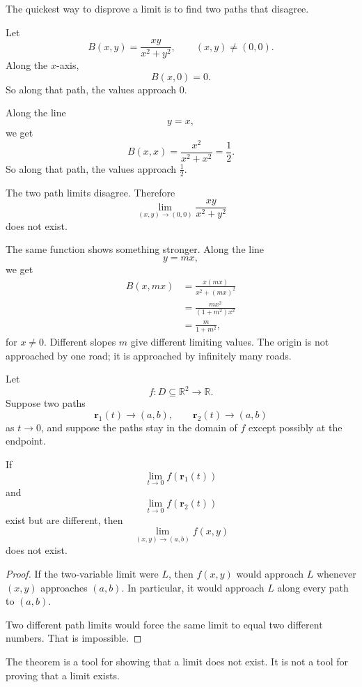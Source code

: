 The quickest way to disprove a limit is to find two paths that disagree.

\begin{example}
Let
\[
    B(x,y)=\frac{xy}{x^2+y^2},
    \qquad (x,y)\ne(0,0).
\]
Along the \(x\)-axis,
\[
    B(x,0)=0.
\]
So along that path, the values approach \(0\).

Along the line
\[
    y=x,
\]
we get
\[
    B(x,x)=\frac{x^2}{x^2+x^2}=\frac12.
\]
So along that path, the values approach \(\frac12\).

The two path limits disagree.  Therefore
\[
    \lim_{(x,y)\to(0,0)}\frac{xy}{x^2+y^2}
\]
does not exist.
\end{example}

The same function shows something stronger.  Along the line
\[
    y=mx,
\]
we get
\[
\begin{aligned}
    B(x,mx)
    &=
    \frac{x(mx)}{x^2+(mx)^2}  \\
    &=
    \frac{mx^2}{(1+m^2)x^2} \\
    &=
    \frac{m}{1+m^2},
\end{aligned}
\]
for \(x\ne0\).  Different slopes \(m\) give different limiting values.  The origin is not
approached by one road; it is approached by infinitely many roads.

\begin{theorem}
Let
\[
    f:D\subseteq\mathbb R^2\to\mathbb R.
\]
Suppose two paths
\[
    \mathbf r_1(t)\to(a,b),
    \qquad
    \mathbf r_2(t)\to(a,b)
\]
as \(t\to0\), and suppose the paths stay in the domain of \(f\) except possibly at the
endpoint.

If
\[
    \lim_{t\to0} f(\mathbf r_1(t))
\]
and
\[
    \lim_{t\to0} f(\mathbf r_2(t))
\]
exist but are different, then
\[
    \lim_{(x,y)\to(a,b)} f(x,y)
\]
does not exist.
\end{theorem}

\begin{proof}
If the two-variable limit were \(L\), then \(f(x,y)\) would approach \(L\) whenever
\((x,y)\) approaches \((a,b)\).  In particular, it would approach \(L\) along every path
to \((a,b)\).

Two different path limits would force the same limit to equal two different numbers.
That is impossible.
\end{proof}

The theorem is a tool for showing that a limit does not exist.  It is not a tool for
proving that a limit exists.

